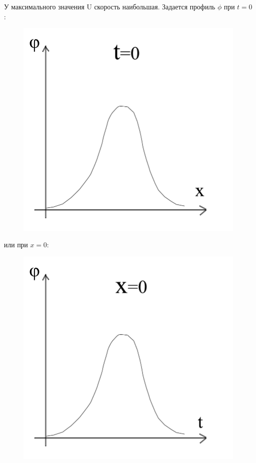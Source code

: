 У максимального значения U скорость наибольшая. Задается профиль $\phi$ при $t=0$:
\begin{figure}[H]
	\centering
	\includegraphics[width=0.4\linewidth]{fig/fig13.pdf}   
\end{figure}
или при $x=0$:
\begin{figure}[H]
	\centering
	\includegraphics[width=0.4\linewidth]{fig/fig14.pdf}   
\end{figure}

